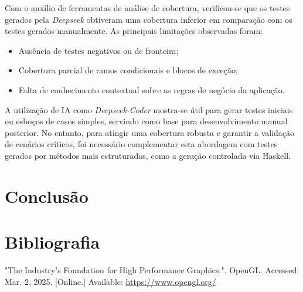 \documentclass[12pt, a4paper]{article}
\begin{document}
Com o auxílio de ferramentas de análise de cobertura, verificou-se que os testes gerados pela
\textit{Deepseek} obtiveram uma cobertura inferior em comparação com os testes gerados manualmente.
As principais limitações observadas foram:

\begin{itemize}
  \item Ausência de testes negativos ou de fronteira;
  \item Cobertura parcial de ramos condicionais e blocos de exceção;
  \item Falta de conhecimento contextual sobre as regras de negócio da aplicação.
\end{itemize}

A utilização de IA como \textit{Deepseek-Coder} mostra-se útil para gerar testes iniciais ou esboços
de casos simples, servindo como base para desenvolvimento manual posterior. No entanto, para atingir
uma cobertura robusta e garantir a validação de cenários críticos, foi necessário complementar esta
abordagem com testes gerados por métodos mais estruturados, como a geração controlada via Haskell.

\section{Conclusão}

\begingroup
\section{Bibliografia}
\renewcommand{\section}[2]{}

\begin{thebibliography}{9}
        "The Industry's Foundation for High Performance Graphics."{}. OpenGL. Accessed:
        Mar. 2, 2025. [Online.] Available: \url{https://www.opengl.org/}
\end{thebibliography}
\endgroup
\end{document}

